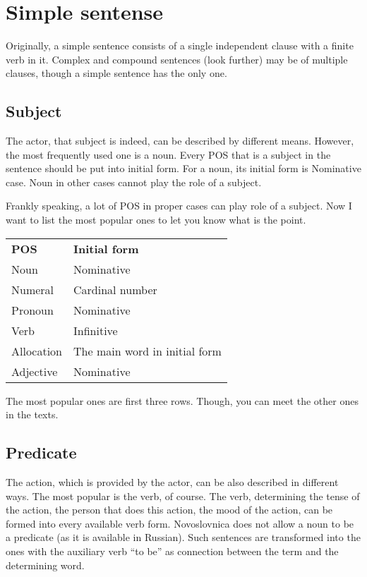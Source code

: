 \section{Simple sentense}

Originally, a simple sentence consists of a single independent clause with a finite verb in it. Complex and compound sentences (look further) may be of multiple clauses, though a simple sentence has the only one.

\subsection{Subject}

The actor, that subject is indeed, can be described by different means. However, the most frequently used one is a noun.  Every POS that is a subject in the sentence should be put into initial form. For a noun, its initial form is Nominative case. Noun in other cases cannot play the role of a subject.

Frankly speaking, a lot of POS in proper cases can play role of a subject. Now I want to list the most popular ones to let you know what is the point.

\begin{table}[h]
	\begin{tabular}{ll}
		\textbf{POS} & \textbf{Initial form} \\
		Noun & Nominative \\
		Numeral & Cardinal number \\
		Pronoun & Nominative \\
		Verb & Infinitive \\
		Allocation & The main word in initial form \\
		Adjective & Nominative \\
	\end{tabular}
\end{table}

The most popular ones are first three rows. Though, you can meet the other ones in the texts.

\subsection{Predicate}
The action, which is provided by the actor, can be also described in different ways. The most popular is the verb, of course. The verb, determining the tense of the action, the person that does this action, the mood of the action, can be formed into every available verb form. Novoslovnica does not allow a noun to be a predicate (as it is available in Russian). Such sentences are transformed into the ones with the auxiliary verb “to be” as connection between the term and the determining word.


